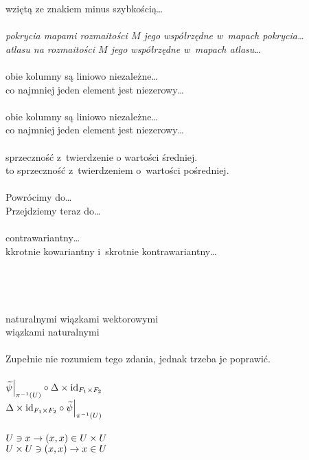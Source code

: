 \documentclass[a4paper,11pt]{article}
\begin{document}
\Pow  wziętą ze znakiem minus szybkością\ldots \\
 \\
\Jest \emph{pokrycia mapami rozmaitości $M$ jego współrzędne
  w~mapach pokrycia\ldots} \\
\Pow \emph{atlasu na rozmaitości $M$ jego współrzędne
  w~mapach atlasu\ldots} \\
 \\
\Jest obie kolumny są liniowo niezależne\ldots \\
\Pow  co najmniej jeden element jest niezerowy\ldots \\
 \\
\Jest obie kolumny są liniowo niezależne\ldots \\
\Pow  co najmniej jeden element jest niezerowy\ldots \\
 \\
\Jest sprzeczność z~twierdzenie o wartości średniej.\\
\Pow  to sprzeczność z~twierdzeniem o~wartości pośredniej.\\
 \\
\Jest Powrócimy do\ldots\\
\Pow  Przejdziemy teraz do\ldots\\
 \\
\Jest contrawariantny\ldots\\
\Pow  k\dywiz krotnie kowariantny i~s\dywiz krotnie kontrawariantny\ldots \\
 \\
\Jest \\
\Pow \\
 \\
\Jest naturalnymi wiązkami wektorowymi\ld \\
\Pow  wiązkami naturalnymi\ld \\
 \\
Zupełnie nie rozumiem tego zdania, jednak trzeba je poprawić. \\
 \\
\Jest $\widetilde{ \psi }\Big|_{ \pi^{ -1 }( U ) } \circ \Delta \times
\textrm{id}_{ F_{ 1 } \times F_{ 2 } }$ \\
\Pow $\Delta \times \textrm{id}_{ F_{ 1 } \times F_{ 2 } } \circ
\widetilde{ \psi }\Big|_{ \pi^{ -1 }( U ) }$ \\
 \\
\Jest $U \ni x \to ( x, x ) \in U \times U$ \\
\Pow $U \times U \ni ( x, x ) \to x \in U$ \\
\end{document}
